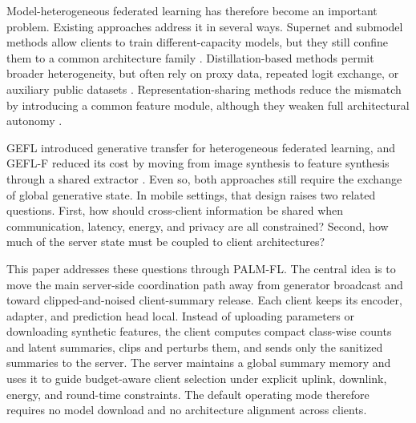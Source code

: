\documentclass[10pt,journal]{IEEEtran}
\begin{document}
Model-heterogeneous federated learning has therefore become an important problem. Existing approaches address it in several ways. Supernet and submodel methods allow clients to train different-capacity models, but they still confine them to a common architecture family \cite{fjord,heterofl,depthfl,nefl}. Distillation-based methods permit broader heterogeneity, but often rely on proxy data, repeated logit exchange, or auxiliary public datasets \cite{avgkd,feddf,fccl,fedmd,fedgh,pfedhr}. Representation-sharing methods reduce the mismatch by introducing a common feature module, although they weaken full architectural autonomy \cite{lgfedavg,fml,fedclassavg,mori}.

GEFL introduced generative transfer for heterogeneous federated learning, and GEFL-F reduced its cost by moving from image synthesis to feature synthesis through a shared extractor \cite{gefl}. Even so, both approaches still require the exchange of global generative state. In mobile settings, that design raises two related questions. First, how should cross-client information be shared when communication, latency, energy, and privacy are all constrained? Second, how much of the server state must be coupled to client architectures?

This paper addresses these questions through PALM-FL. The central idea is to move the main server-side coordination path away from generator broadcast and toward clipped-and-noised client-summary release. Each client keeps its encoder, adapter, and prediction head local. Instead of uploading parameters or downloading synthetic features, the client computes compact class-wise counts and latent summaries, clips and perturbs them, and sends only the sanitized summaries to the server. The server maintains a global summary memory and uses it to guide budget-aware client selection under explicit uplink, downlink, energy, and round-time constraints. The default operating mode therefore requires no model download and no architecture alignment across clients.
\end{document}
